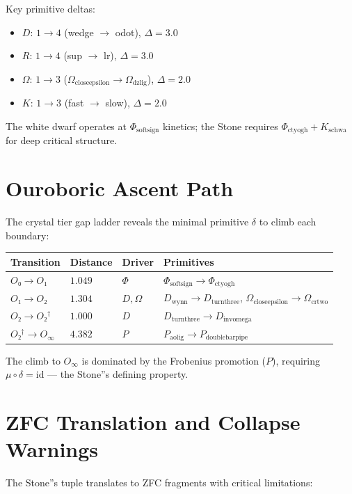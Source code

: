 \documentclass[twocolumn]{article}
\begin{document}
Key primitive deltas:
\begin{itemize}
    \item $D$: $1 \to 4$ (wedge $\to$ odot), $\Delta = 3.0$
    \item $R$: $1 \to 4$ (sup $\to$ lr), $\Delta = 3.0$
    \item $\Omega$: $1 \to 3$ ($\Omega_{\text{closeepsilon}} \to \Omega_{\text{dzlig}}$), $\Delta = 2.0$
    \item $K$: $1 \to 3$ (fast $\to$ slow), $\Delta = 2.0$
\end{itemize}

The white dwarf operates at $\Phi_{\text{softsign}}$ kinetics; the Stone requires $\Phi_{\text{ctyogh}} + K_{\text{schwa}}$ for deep critical structure.

\section{Ouroboric Ascent Path}

The crystal tier gap ladder reveals the minimal primitive $\delta$ to climb each boundary:

\begin{center}
\begin{tabular}{llll}
\hline
Transition & Distance & Driver & Primitives \\
\hline
$O₀ \to O₁$ & $1.049$ & $\Phi$ & $\Phi_{\text{softsign}} \to \Phi_{\text{ctyogh}}$ \\
$O₁ \to O₂$ & $1.304$ & $D, \Omega$ & $D_{\text{wynn}} \to D_{\text{turnthree}}$, $\Omega_{\text{closeepsilon}} \to \Omega_{\text{crtwo}}$ \\
$O₂ \to O₂^\dagger$ & $1.000$ & $D$ & $D_{\text{turnthree}} \to D_{\text{invomega}}$ \\
$O₂^\dagger \to O_{\infty}$ & $4.382$ & $P$ & $P_{\text{aolig}} \to P_{\text{doublebarpipe}}$ \\
\hline
\end{tabular}
\end{center}

The climb to $O_{\infty}$ is dominated by the Frobenius promotion ($P$), requiring $\mu \circ \delta = \text{id}$ --- the Stone''s defining property.

\section{ZFC Translation and Collapse Warnings}

The Stone''s tuple translates to ZFC fragments with critical limitations:
\end{document}
